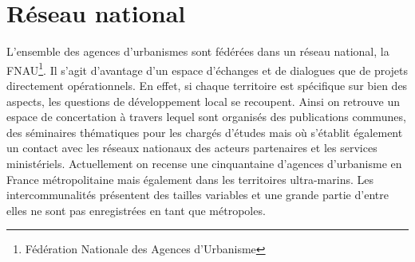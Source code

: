\documentclass{bredele}
\begin{document}
\section{Réseau national}
L’ensemble des agences d’urbanismes sont fédérées dans un réseau national, la FNAU\footnote{Fédération Nationale des Agences d'Urbanisme}. Il s’agit d’avantage d’un espace d’échanges et de dialogues que de projets directement opérationnels. En effet, si chaque territoire est spécifique sur bien des aspects, les questions de développement local se recoupent. Ainsi on retrouve un espace de concertation à travers lequel sont organisés des publications communes, des séminaires thématiques pour les chargés d’études mais où s’établit également un contact avec les réseaux nationaux des acteurs partenaires et les services ministériels. Actuellement on recense une cinquantaine d’agences d’urbanisme en France métropolitaine mais également dans les territoires ultra-marins. Les intercommunalités présentent des tailles variables et une grande partie d’entre elles ne sont pas enregistrées en tant que métropoles.
\end{document}
